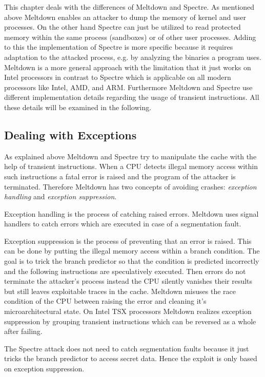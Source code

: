 \documentclass[a4paper,oneside,openright] {scrreprt}
\begin{document}
This chapter deals with the differences of Meltdown and Spectre. As mentioned above Meltdown enables an attacker 
to dump the memory of kernel and user processes. On the other hand Spectre can just be utilized to read protected memory within 
the same process (sandboxes) or of other user processes.
Adding to this the implementation of Spectre is more specific because it requires adaptation to the attacked process,
 e.g. by analyzing the binaries a program uses. Meltdown is a more general approach with the limitation that it just works on Intel
 processors in contrast to Spectre which is applicable on all modern processors like Intel, AMD, and ARM. Furthermore Meltdown and 
 Spectre use different implementation details regarding the usage of transient instructions. 
 All these details will be examined in the following.

\subsection{Dealing with Exceptions}
\label{ch:intro:motivation:A}

As explained above Meltdown and Spectre try to manipulate the cache with the help of transient instructions. 
When a CPU detects illegal memory access within such instructions a fatal error is raised and the program of the attacker
is terminated. Therefore Meltdown has two concepts of avoiding crashes: \textit{exception handling} and \textit{exception suppression}.

Exception handling is the process of catching raised errors. Meltdown uses signal handlers to catch errors
which are executed in case of a segmentation fault.

Exception suppression is the process of preventing that an error is raised. This can be done by putting the illegal memory access
within a branch condition. The goal is to trick the branch predictor so that the condition is predicted incorrectly and the following
instructions are speculatively executed.
Then errors do not terminate the attacker's process instead the CPU silently vanishes their results
 but still leaves exploitable traces in the cache.
Meltdown misuses the race condition of the CPU between raising the error and cleaning it's microarchitectural state. On Intel TSX processors Meltdown realizes exception suppression by grouping transient instructions which can be
 reversed as a whole after failing.

The Spectre attack does not need to catch segmentation faults because it just tricks the branch predictor to access secret data. 
Hence the exploit is only based on exception suppression.
\end{document}

